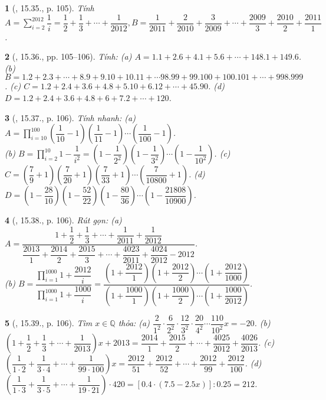 \documentclass{article}
\newtheorem{baitoan}{}
\begin{document}
\begin{baitoan}[\cite{TLCT_THCS_Toan_6_so_hoc}, 15.35., p. 105]
	Tính $A = \sum_{i=2}^{2012} \dfrac{1}{i} = \dfrac{1}{2} + \dfrac{1}{3} + \cdots + \dfrac{1}{2012},B = \dfrac{1}{2011} + \dfrac{2}{2010} + \dfrac{3}{2009} + \cdots + \dfrac{2009}{3} + \dfrac{2010}{2} + \dfrac{2011}{1}$.
\end{baitoan}

\begin{baitoan}[\cite{TLCT_THCS_Toan_6_so_hoc}, 15.36., pp. 105--106]
	Tính: (a) $A = 1.1 + 2.6 + 4.1 + 5.6 + \cdots + 148.1 + 149.6$. (b) $B = 1.2 + 2.3 + \cdots + 8.9 + 9.10 + 10.11 + \cdots 98.99 + 99.100 + 100.101 + \cdots + 998.999$. (c) $C = 1.2 + 2.4 + 3.6 + 4.8 + 5.10 + 6.12 + \cdots + 45.90$. (d) $D = 1.2 + 2.4 + 3.6 + 4.8 + 6 + 7.2 + \cdots + 120$.
\end{baitoan}

\begin{baitoan}[\cite{TLCT_THCS_Toan_6_so_hoc}, 15.37., p. 106]
	Tính nhanh: (a) $A = \prod_{i=10}^{100} \left(\dfrac{1}{10} - 1\right)\left(\dfrac{1}{11} - 1\right)\cdots\left(\dfrac{1}{100} - 1\right)$.\\(b) $B = \prod_{i=2}^{10} 1 - \dfrac{1}{i^2} = \left(1 - \dfrac{1}{2^2}\right)\left(1 - \dfrac{1}{3^2}\right)\cdots\left(1 - \dfrac{1}{10^2}\right)$. (c) $C = \left(\dfrac{7}{9} + 1\right)\left(\dfrac{7}{20} + 1\right)\left(\dfrac{7}{33} + 1\right)\cdots\left(\dfrac{7}{10800} + 1\right)$. (d) $D = \left(1 - \dfrac{28}{10}\right)\left(1 - \dfrac{52}{22}\right)\left(1 - \dfrac{80}{36}\right)\cdots\left(1 - \dfrac{21808}{10900}\right)$.
\end{baitoan}

\begin{baitoan}[\cite{TLCT_THCS_Toan_6_so_hoc}, 15.38., p. 106]
	Rút gọn: (a) $A = \dfrac{1 + \dfrac{1}{2} + \dfrac{1}{3} + \cdots + \dfrac{1}{2011} + \dfrac{1}{2012}}{\dfrac{2013}{1} + \dfrac{2014}{2} + \dfrac{2015}{3} + \cdots + \dfrac{4023}{2011} + \dfrac{4024}{2012} - 2012}$.\\(b) $B = \dfrac{\prod_{i=1}^{1000} 1 + \dfrac{2012}{i}}{\prod_{i=1}^{1000} 1 + \dfrac{1000}{i}} = \dfrac{\left(1 + \dfrac{2012}{1}\right)\left(1 + \dfrac{2012}{2}\right)\cdots\left(1 + \dfrac{2012}{1000}\right)}{\left(1 + \dfrac{1000}{1}\right)\left(1 + \dfrac{1000}{2}\right)\cdots\left(1 + \dfrac{1000}{2012}\right)}$.
\end{baitoan}

\begin{baitoan}[\cite{TLCT_THCS_Toan_6_so_hoc}, 15.39., p. 106]
	Tìm $x\in\mathbb{Q}$ thỏa: (a) $\dfrac{2}{1^2}\cdot\dfrac{6}{2^2}\cdot\dfrac{12}{3^2}\cdot\dfrac{20}{4^2}\cdots\dfrac{110}{10^2}x = -20$. (b) $\left(1 + \dfrac{1}{2} + \dfrac{1}{3} + \cdots + \dfrac{1}{2013}\right)x + 2013 = \dfrac{2014}{1} + \dfrac{2015}{2} + \cdots + \dfrac{4025}{2012} + \dfrac{4026}{2013}$. (c) $\left(\dfrac{1}{1\cdot2} + \dfrac{1}{3\cdot4} + \cdots + \dfrac{1}{99\cdot100}\right)x = \dfrac{2012}{51} + \dfrac{2012}{52} + \cdots + \dfrac{2012}{99} + \dfrac{2012}{100}$. (d) $\left(\dfrac{1}{1\cdot3} + \dfrac{1}{3\cdot5} + \cdots + \dfrac{1}{19\cdot21}\right)\cdot420 = [0.4\cdot(7.5 - 2.5x)]:0.25 = 212$.
\end{baitoan}
\end{document}
